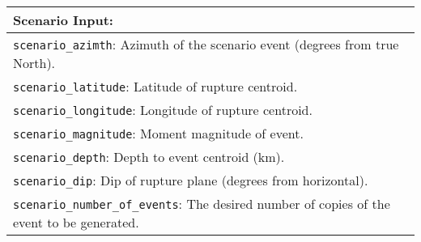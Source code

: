 \documentclass[a4paper, 12pt]{report}
\begin{document}
\vspace{2em}
\begin{tabular}{|p{\textwidth}|}
\hline
\vspace{0.3em} \noindent \Large \textbf{Scenario Input:} \normalsize \\
\hline
\vspace{0.1em} \texttt{scenario\_azimth}: 
Azimuth of the scenario event (degrees from true North).   \\
\hline
\vspace{0.1em} \texttt{scenario\_latitude}: 
Latitude of rupture centroid. \\
\hline
\vspace{0.1em} \texttt{scenario\_longitude}: 
Longitude of rupture centroid.    \\
\hline
\vspace{0.1em} \texttt{scenario\_magnitude}: 
 Moment magnitude of event.    \\
\hline
\vspace{0.1em} \texttt{scenario\_depth}: 
Depth to event centroid (km).    \\
\hline
\vspace{0.1em} \texttt{scenario\_dip}: 
Dip of rupture plane (degrees from horizontal).  \\
\hline
\vspace{0.1em} \texttt{scenario\_number\_of\_events}: 
 The desired number of
copies of the event to be generated. \\
\hline
 \end{tabular}
\end{document}
